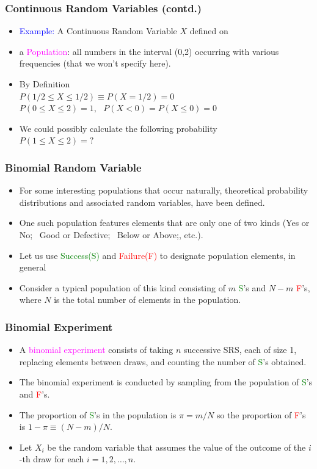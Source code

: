 \documentclass[xcolor=dvipsnames,12pt]{beamer}
\begin{document}
\begin{frame}
\frametitle{Continuous Random Variables (contd.)}
\begin{itemize}
\item \textcolor{blue}{Example:} A Continuous Random Variable $X$ defined on 
\item a \textcolor{magenta}{Population}: all numbers in the interval (0,2) occurring with various
frequencies (that we won't specify here).
\item By Definition\\
$P(1/2 \leq X \leq 1/2) \equiv P(X = 1/2) = 0$ \\
$P(0 \leq X \leq 2) = 1,\ \ \ P(X < 0) = P(X \leq 0) = 0$ 
\item  We could possibly calculate the following probability\\ $P(1 \leq X \leq 2) = ?$
\end{itemize}
\end{frame}


\begin{frame}
\frametitle{Binomial Random Variable}
\begin{itemize}
\item For some interesting populations that occur naturally, theoretical
probability distributions and associated random variables, have
been defined. 
\item One such population features elements that are only
one of two kinds (Yes or No; \ Good or Defective; \ Below or
Above;, etc.).
\item Let us use \textcolor{green}{Success(S)} and \textcolor{red}{Failure(F)} to designate population
elements, in general
\item Consider a typical population of this kind consisting of 
$m$ \textcolor{green}{S}'s and $N-m$ \textcolor{red}{F}'s, where $N$ is the total number of elements in
the population.
\end{itemize}
\end{frame} 


\begin{frame}
\frametitle{Binomial Experiment}
\begin{itemize}
\item A \textcolor{magenta}{binomial experiment} consists of taking $n$ successive SRS,
each of size 1, replacing elements between draws, and counting
the number of \textcolor{green}{S}'s obtained.
\item The binomial experiment is conducted by sampling from the population
of \textcolor{green}{S}'s and \textcolor{red}{F}'s. 
\item The proportion of \textcolor{green}{S}'s in the population is $\pi = m/N$ 
so the proportion of \textcolor{red}{F}'s is $1 - \pi \equiv (N-m)/N$.
\item Let $X_i$ be the random variable that assumes the value of the
outcome of the $i$-th draw  for each $i=1,2,\ldots,n$. 
\end{itemize}
\end{frame}
\end{document}
